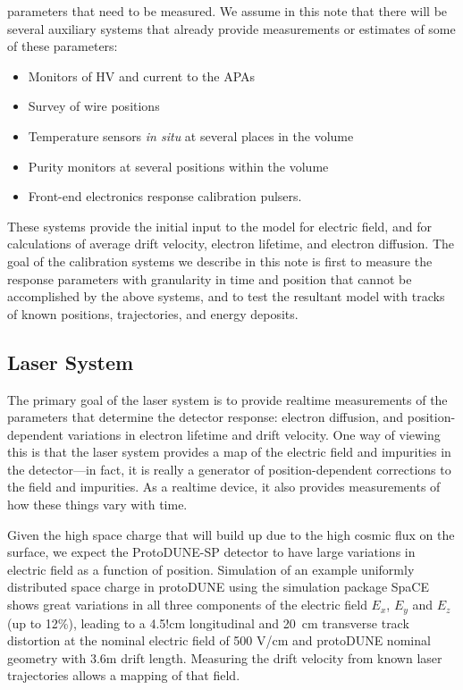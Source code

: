 parameters that need to be measured.  We assume in this note that there will be
several auxiliary systems that already provide measurements or estimates of
some of these parameters:
\begin{itemize}
\item Monitors of HV and current to the APAs
\item Survey of wire positions
\item Temperature sensors {\it in situ} at several places in the volume
\item Purity monitors at several positions within the volume
\item Front-end electronics response calibration pulsers.
\end{itemize}
	These systems provide the initial input to the model for electric
field, and for calculations of average drift velocity, electron lifetime, and
electron diffusion.  The goal of the calibration systems we describe in this
note is first to measure the response parameters with granularity in time and
position that cannot be accomplished by the above systems, and to test the
resultant model with tracks of known positions, trajectories, and energy
deposits.
	
\subsection{Laser System}	

	The primary goal of the laser system is to provide realtime
measurements of the parameters that determine the detector response: electron
diffusion, and position-dependent variations in electron lifetime and drift
velocity.  One way of viewing this is that the laser system provides a
map of the electric field and impurities in the detector---in fact, it is
really a generator of position-dependent corrections to the field and
impurities.  As a realtime device, it also provides measurements of how these
things vary with time.

	Given the high space charge that will build up due to the high cosmic
flux on the surface, we expect the ProtoDUNE-SP detector to have large
variations in electric field as a function of position.  Simulation of an
example uniformly distributed space charge in protoDUNE using the simulation
package SpaCE~\cite{mooney} shows great variations in all three components of
the electric field $E_x$, $E_y$ and $E_z$ (up to 12\%), leading to a 4.5!cm
longitudinal and 20~cm transverse track distortion at the nominal electric
field of 500 V/cm and protoDUNE nominal geometry with 3.6m drift length.
Measuring the drift velocity from known laser trajectories allows a mapping of
that field.

